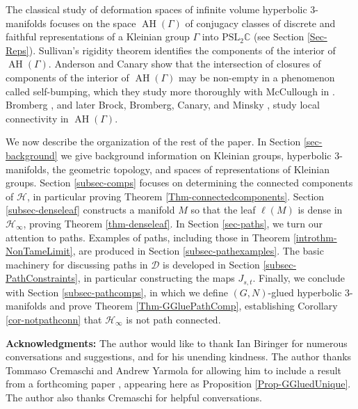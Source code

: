 \documentclass[11pt,leqno]{article}
\DeclareMathOperator{\AH}{AH}
\theoremstyle{introdef}
\numberwithin{lemma}{section}
\theoremstyle{definition}
\newcommand{\C}{\mathbb{C}}
\begin{document}
The classical study of deformation spaces of infinite volume hyperbolic $3$-manifolds focuses on the space $\AH(\Gamma)$ of conjugacy classes of discrete and faithful representations of a Kleinian group $\Gamma$ into $\mathrm{PSL}_2\C$ (see Section \ref{Sec-Reps}). Sullivan's rigidity theorem \cite{SUL} identifies the components of the interior of $\AH(\Gamma)$. Anderson and Canary \cite{ACBumping} show that the intersection of closures of components of the interior of $\AH(\Gamma)$ may be non-empty in a phenomenon called self-bumping, which they study more thoroughly with McCullough in \cite{ACM}. Bromberg \cite{KEN}, and later Brock, Bromberg, Canary, and Minsky \cite{BBCM}, study local connectivity in $\AH(\Gamma)$.\par

We now describe the organization of the rest of the paper. In Section \ref{sec-background} we give background information on Kleinian groups, hyperbolic $3$-manifolds, the geometric topology, and spaces of representations of Kleinian groups. Section \ref{subsec-comps} focuses on determining the connected components of $\mathcal{H}$, in particular proving Theorem \ref{Thm-connectedcomponents}. Section \ref{subsec-denseleaf} constructs a manifold $M$ so that the leaf $\ell(M)$ is dense in $\mathcal{H}_\infty$, proving Theorem \ref{thm-denseleaf}. In Section \ref{sec-paths}, we turn our attention to paths. Examples of paths, including those in Theorem \ref{introthm-NonTameLimit}, are produced in Section \ref{subsec-pathexamples}. The basic machinery for discussing paths in $\mathcal{D}$ is developed in Section \ref{subsec-PathConstraints}, in particular constructing the maps $J_{s,t}$. Finally, we conclude with Section \ref{subsec-pathcomps}, in which we define $(G,N)$-glued hyperbolic $3$-manifolds and prove Theorem \ref{Thm-GGluePathComp}, establishing Corollary \ref{cor-notpathconn} that $\mathcal{H}_\infty$ is not path connected.\par

\vspace{0.1in}

\textbf{Acknowledgments:} The author would like to thank Ian Biringer for numerous conversations and suggestions, and for his unending kindness. The author thanks Tommaso Cremaschi and Andrew Yarmola for allowing him to include a result from a forthcoming paper \cite{CREMYAR}, appearing here as Proposition \ref{Prop-GGluedUnique}. The author also thanks Cremaschi for helpful conversations.
\end{document}
